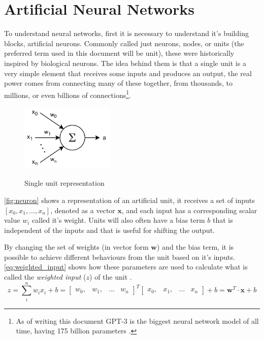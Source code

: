 \section{Artificial Neural Networks}
To understand neural networks, first it is necessary to understand it's building blocks, artificial neurons. Commonly called just neurons, nodes, or units (the preferred term used in this document will be unit), these were historically inspired by biological neurons. The idea behind them is that a single unit is a very simple element that receives some inputs and produces an output, the real power comes from connecting many of these together, from thousands, to millions, or even billions of connections\footnote{
  As of writing this document GPT-3 is the biggest neural network model of all time, having 175 billion parameters \cite{gpt3_2020}.
}.
\begin{figure}[hbt]
    \centering
    \caption{Single unit representation}
    \includegraphics[width=0.4\textwidth]{chapters/NeuralNets/figures/neuron.pdf}
    \label{fig:neuron}
\end{figure}

\autoref{fig:neuron} shows a representation of an artificial unit, it receives a set of inputs $[x_0, x_1, ..., x_n]$, denoted as a vector $\bm{x}$, and each input has a corresponding scalar value $w_i$ called it's weight. Units will also often have a bias term $b$ that is independent of the inputs and that is useful for shifting the output.

By changing the set of weights (in vector form $\bm{w}$) and the bias term, it is possible to achieve different behaviours from the unit based on it's inputs. \autoref{eq:weighted_input} shows how these parameters are used to calculate what is called the \textit{weighted input} ($z$) of the unit \cite[Chapter 2]{NN&DL2015}.
\begin{equation} \label{eq:weighted_input}
    z = \sum_{i}^{n}{w_i x_i} + b =
    \begin{bmatrix}w_0, & w_1, & ... & w_n\end{bmatrix}^T
    \begin{bmatrix}x_0, & x_1, & ... & x_n\end{bmatrix} + b =
    \bm{w}^T \cdot \bm{x} + b
\end{equation}

